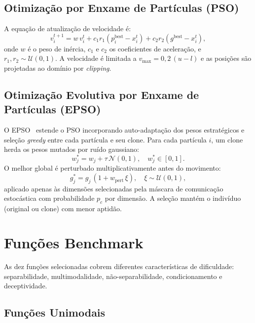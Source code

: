 \documentclass[runningheads]{llncs}
\begin{document}
\subsection{Otimização por Enxame de Partículas (PSO)}

A equação de atualização de velocidade é:
\begin{equation}
  v_i^{t+1} = w\,v_i^t
    + c_1 r_1 (p_i^{\text{best}} - x_i^t)
    + c_2 r_2 (g^{\text{best}} - x_i^t),
\end{equation}
onde $w$ é o peso de inércia, $c_1$ e $c_2$ os coeficientes de
aceleração, e $r_1, r_2 \sim \mathcal{U}(0,1)$. A velocidade é
limitada a $v_{\max} = 0{,}2\,(u - l)$ e as posições são projetadas
ao domínio por \emph{clipping}.


\subsection{Otimização Evolutiva por Enxame de Partículas (EPSO)}

O EPSO~\cite{miranda2002} estende o PSO incorporando auto-adaptação
dos pesos estratégicos e seleção \emph{greedy} entre cada partícula e
seu clone. Para cada partícula $i$, um clone herda os pesos mutados
por ruído gaussiano:
\begin{equation}
  w_j^* = w_j + \tau\,\mathcal{N}(0,1), \quad w_j^* \in [0,1].
\end{equation}
O melhor global é perturbado multiplicativamente antes do movimento:
\begin{equation}
  g_j^* = g_j\,(1 + w_{\text{pert}}\,\xi), \quad \xi \sim \mathcal{U}(0,1),
\end{equation}
aplicado apenas às dimensões selecionadas pela máscara de comunicação
estocástica com probabilidade $p_c$ por dimensão. A seleção mantém o
indivíduo (original ou clone) com menor aptidão.


\section{Fun\c{c}\~{o}es Benchmark}\label{sec:benchmark}

As dez funções selecionadas cobrem diferentes características de
dificuldade: separabilidade, multimodalidade, não-separabilidade,
condicionamento e deceptividade.

\subsection{Fun\c{c}\~{o}es Unimodais}
\end{document}
